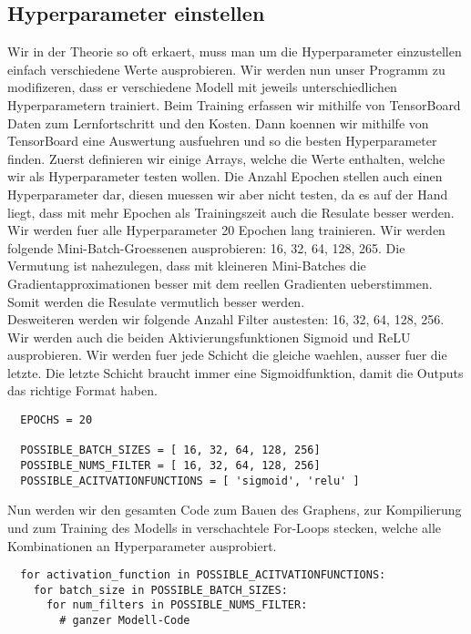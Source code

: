 \subsection{Hyperparameter einstellen}
Wir in der Theorie so oft erkaert, muss man um die Hyperparameter einzustellen
einfach verschiedene Werte ausprobieren. Wir werden nun unser Programm zu
modifizeren, dass er verschiedene Modell mit jeweils unterschiedlichen
Hyperparametern trainiert. Beim Training erfassen wir mithilfe von TensorBoard
Daten zum Lernfortschritt und den Kosten. Dann koennen wir mithilfe von
TensorBoard eine Auswertung ausfuehren und so die besten Hyperparameter finden.
\para{}
Zuerst definieren wir einige Arrays, welche die Werte enthalten, welche wir als
Hyperparameter testen wollen. Die Anzahl Epochen stellen auch einen
Hyperparameter dar, diesen muessen wir aber nicht testen, da es auf der Hand
liegt, dass mit mehr Epochen als Trainingszeit auch die Resulate besser werden.
Wir werden fuer alle Hyperparameter 20 Epochen lang trainieren.
\para{}
Wir werden folgende Mini-Batch-Groessenen ausprobieren: 16, 32, 64, 128, 265.
Die Vermutung ist nahezulegen, dass mit kleineren Mini-Batches die
Gradientapproximationen besser mit dem reellen Gradienten ueberstimmen. Somit
werden die Resulate vermutlich besser werden. \\
Desweiteren werden wir folgende Anzahl Filter austesten: 16, 32, 64, 128, 256.
Wir werden auch die beiden Aktivierungsfunktionen Sigmoid und ReLU ausprobieren.
Wir werden fuer jede Schicht die gleiche waehlen, ausser fuer die letzte. Die
letzte Schicht braucht immer eine Sigmoidfunktion, damit die Outputs das
richtige Format haben.

\begin{verbatim}
  EPOCHS = 20

  POSSIBLE_BATCH_SIZES = [ 16, 32, 64, 128, 256]
  POSSIBLE_NUMS_FILTER = [ 16, 32, 64, 128, 256]
  POSSIBLE_ACITVATIONFUNCTIONS = [ 'sigmoid', 'relu' ]
\end{verbatim}
Nun werden wir den gesamten Code zum Bauen des Graphens, zur Kompilierung und
zum Training des Modells in verschachtele For-Loops stecken, welche alle
Kombinationen an Hyperparameter ausprobiert.

\begin{verbatim}
  for activation_function in POSSIBLE_ACITVATIONFUNCTIONS:
    for batch_size in POSSIBLE_BATCH_SIZES:
      for num_filters in POSSIBLE_NUMS_FILTER:
        # ganzer Modell-Code
\end{verbatim}

